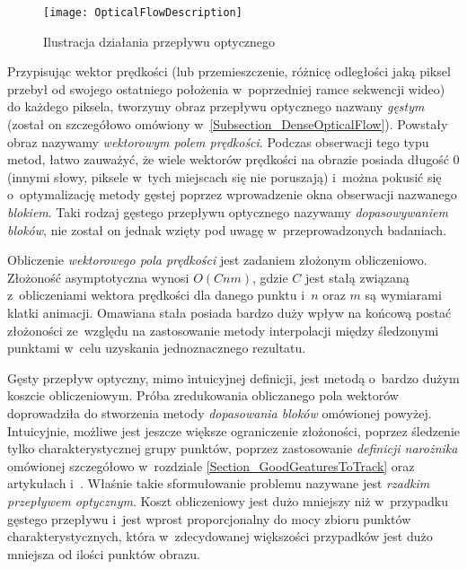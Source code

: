     \begin{figure}[!ht]
      \centering
      \texttt{[image: OpticalFlowDescription]}
      \caption[Ilustracja działania przepływu optycznego]{Ilustracja działania przepływu optycznego}
      \label{fig:OpticalFlowDescription}
    \end{figure}

    Przypisując wektor prędkości (lub przemieszczenie, różnicę odległości jaką piksel przebył od swojego ostatniego położenia w~poprzedniej ramce sekwencji wideo) do każdego piksela, tworzymy obraz przepływu optycznego nazwany \textit{gęstym} (został on szczegółowo omówiony w~\ref{Subsection_DenseOpticalFlow}). Powstały obraz nazywamy \textit{wektorowym polem prędkości}. Podczas obserwacji tego typu metod, łatwo zauważyć, że wiele wektorów prędkości na obrazie posiada długość $0$ (innymi słowy, piksele w~tych miejscach się nie poruszają) i~można pokusić się o~optymalizację metody gęstej poprzez wprowadzenie okna obserwacji nazwanego \textit{blokiem}. Taki rodzaj gęstego przepływu optycznego nazywamy \textit{dopasowywaniem bloków}, nie został on jednak wzięty pod uwagę w~przeprowadzonych badaniach.

    Obliczenie \textit{wektorowego pola prędkości} jest zadaniem złożonym obliczeniowo. Złożoność asymptotyczna wynosi $O(Cnm)$, gdzie $C$ jest stałą związaną z~obliczeniami wektora prędkości dla danego punktu i~$n$ oraz $m$ są wymiarami klatki animacji. Omawiana stała posiada bardzo duży wpływ na końcową postać złożoności ze~względu na zastosowanie metody interpolacji między śledzonymi punktami w~celu uzyskania jednoznacznego rezultatu.

    Gęsty przepływ optyczny, mimo intuicyjnej definicji, jest metodą o~bardzo dużym koszcie obliczeniowym. Próba zredukowania obliczanego pola wektorów doprowadziła do stworzenia metody \textit{dopasowania bloków} omówionej powyżej. Intuicyjnie, możliwe jest jeszcze większe ograniczenie złożoności, poprzez śledzenie tylko charakterystycznej grupy punktów, poprzez zastosowanie \textit{definicji narożnika} omówionej szczegółowo w~rozdziale \ref{Section_GoodGeaturesToTrack} oraz artykułach \cite{LucasKanadeTracker81} i~\cite{GoodFeaturesToTrack94}. Właśnie takie sformułowanie problemu nazywane jest \textit{rzadkim przepływem optycznym}. Koszt obliczeniowy jest dużo mniejszy niż w~przypadku gęstego przepływu i~jest wprost proporcjonalny do mocy zbioru punktów charakterystycznych, która w~zdecydowanej większości przypadków jest dużo mniejsza od ilości punktów obrazu.

